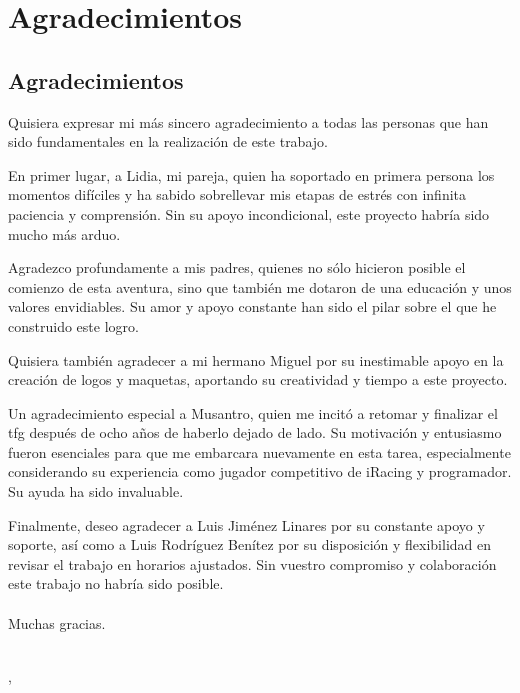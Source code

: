 \ifspanish
\else
\fi


%
%
\chapter*{Agradecimientos} %

 \section*{Agradecimientos}

Quisiera expresar mi más sincero agradecimiento a todas las personas que han sido fundamentales en la realización de este trabajo.

En primer lugar, a Lidia, mi pareja, quien ha soportado en primera persona los momentos difíciles y ha sabido sobrellevar mis etapas de estrés con infinita paciencia y comprensión. Sin su apoyo incondicional, este proyecto habría sido mucho más arduo.

Agradezco profundamente a mis padres, quienes no sólo hicieron posible el comienzo de esta aventura, sino que también me dotaron de una educación y unos valores envidiables. Su amor y apoyo constante han sido el pilar sobre el que he construido este logro.

Quisiera también agradecer a mi hermano Miguel por su inestimable apoyo en la creación de logos y maquetas, aportando su creatividad y tiempo a este proyecto.

Un agradecimiento especial a Musantro, quien me incitó a retomar y finalizar el \ac{tfg} después de ocho años de haberlo dejado de lado. Su motivación y entusiasmo fueron esenciales para que me embarcara nuevamente en esta tarea, especialmente considerando su experiencia como jugador competitivo de iRacing y programador. Su ayuda ha sido invaluable.

Finalmente, deseo agradecer a Luis Jiménez Linares por su constante apoyo y soporte, así como a Luis Rodríguez Benítez por su disposición y flexibilidad en revisar el trabajo en horarios ajustados. Sin vuestro compromiso y colaboración este trabajo no habría sido posible.
\\\\
Muchas gracias.


\makeatletter		
\begin{flushright}
	\vspace{1,5cm}
	\textit{\@autor}\\
	\@cityTF, \@yearTF
\end{flushright}
\makeatother